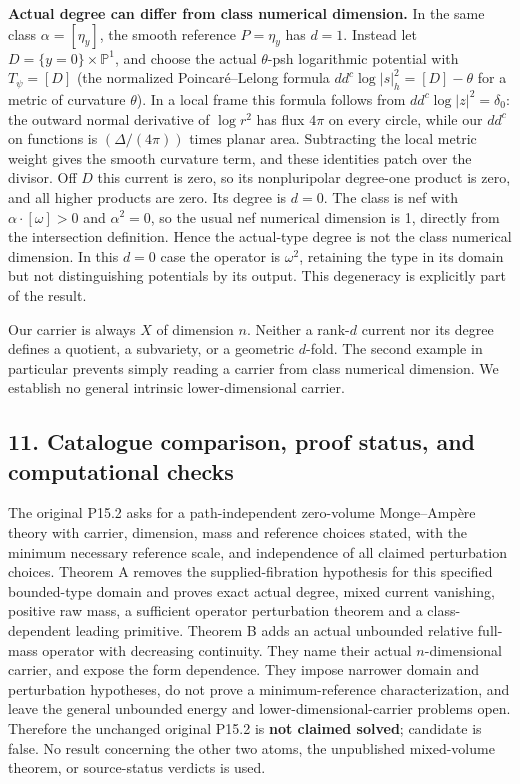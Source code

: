 \documentclass[
  10pt,
]{article}
\begin{document}
\textbf{Actual degree can differ from class numerical dimension.} In the
same class \(\alpha=[\eta_y]\), the smooth reference \(P=\eta_y\) has
\(d=1\). Instead let \(D=\{y=0\}\times\mathbb P^1\), and choose the
actual \(\theta\)-psh logarithmic potential with \(T_\psi=[D]\) (the
normalized Poincaré--Lelong formula \(dd^c\log|s|_h^2=[D]-\theta\) for a
metric of curvature \(\theta\)). In a local frame this formula follows
from \(dd^c\log|z|^2=\delta_0\): the outward normal derivative of
\(\log r^2\) has flux \(4\pi\) on every circle, while our \(dd^c\) on
functions is \((\Delta/(4\pi))\) times planar area. Subtracting the
local metric weight gives the smooth curvature term, and these
identities patch over the divisor. Off \(D\) this current is zero, so
its nonpluripolar degree-one product is zero, and all higher products
are zero. Its degree is \(d=0\). The class is nef with
\(\alpha\cdot[\omega]>0\) and \(\alpha^2=0\), so the usual nef numerical
dimension is 1, directly from the intersection definition. Hence the
actual-type degree is not the class numerical dimension. In this \(d=0\)
case the operator is \(\omega^2\), retaining the type in its domain but
not distinguishing potentials by its output. This degeneracy is
explicitly part of the result.

Our carrier is always \(X\) of dimension \(n\). Neither a rank-\(d\)
current nor its degree defines a quotient, a subvariety, or a geometric
\(d\)-fold. The second example in particular prevents simply reading a
carrier from class numerical dimension. We establish no general
intrinsic lower-dimensional carrier.

\subsection{11. Catalogue comparison, proof status, and computational
checks}\label{catalogue-comparison-proof-status-and-computational-checks}

The original P15.2 asks for a path-independent zero-volume Monge--Ampère
theory with carrier, dimension, mass and reference choices stated, with
the minimum necessary reference scale, and independence of all claimed
perturbation choices. Theorem A removes the supplied-fibration
hypothesis for this specified bounded-type domain and proves exact
actual degree, mixed current vanishing, positive raw mass, a sufficient
operator perturbation theorem and a class-dependent leading primitive.
Theorem B adds an actual unbounded relative full-mass operator with
decreasing continuity. They name their actual \(n\)-dimensional carrier,
and expose the form dependence. They impose narrower domain and
perturbation hypotheses, do not prove a minimum-reference
characterization, and leave the general unbounded energy and
lower-dimensional-carrier problems open. Therefore the unchanged
original P15.2 is \textbf{not claimed solved}; candidate is false. No
result concerning the other two atoms, the unpublished mixed-volume
theorem, or source-status verdicts is used.
\end{document}
